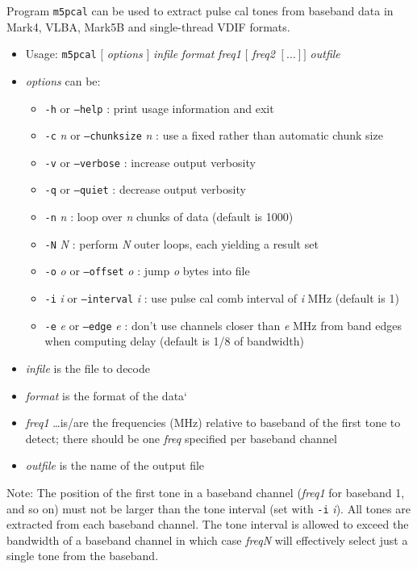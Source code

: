 Program {\tt m5pcal} can be used to extract pulse cal tones from baseband data in Mark4, VLBA, Mark5B and single-thread VDIF formats.

\begin{itemize}
\item[] Usage: {\tt m5pcal} $[$ {\em options} $]$ {\em infile} {\em format} {\em freq1} $[$ {\em freq2} $[ \ldots ] ]$ {\em outfile}
\item[] {\em options} can be:
\begin{itemize}
\item[] {\tt -h} or {\tt --help} : print usage information and exit
\item[] {\tt -c} {\em n} or {\tt --chunksize} {\em n} : use a fixed rather than automatic chunk size
\item[] {\tt -v} or {\tt --verbose} : increase output verbosity
\item[] {\tt -q} or {\tt --quiet} : decrease output verbosity
\item[] {\tt -n} {\em n} : loop over {\em n} chunks of data (default is 1000)
\item[] {\tt -N} {\em N} : perform {\em N} outer loops, each yielding a result set
\item[] {\tt -o} {\em o} or {\tt --offset} {\em o} : jump {\em o} bytes into file
\item[] {\tt -i} {\em i} or {\tt --interval} {\em i} : use pulse cal comb interval of {\em i} MHz (default is 1)
\item[] {\tt -e} {\em e} or {\tt --edge} {\em e} : don't use channels closer than {\em e} MHz from band edges when computing delay (default is 1/8 of bandwidth)
\end{itemize}
\item[] {\em infile} is the file to decode
\item[] {\em format} is the format of the data`
\item[] {\em freq1} \ldots is/are the frequencies (MHz) relative to baseband of the first tone to detect; there should be one {\em freq} specified per baseband channel
\item[] {\em outfile} is the name of the output file
\end{itemize}

Note: The position of the first tone in a baseband channel ({\em freq1} for baseband 1, and so on) must not be larger than the tone interval (set with {\tt -i} {\em i}).
All tones are extracted from each baseband channel.
The tone interval is allowed to exceed the bandwidth of a baseband channel in which case {\em freqN} will effectively select just a single tone from the baseband.


